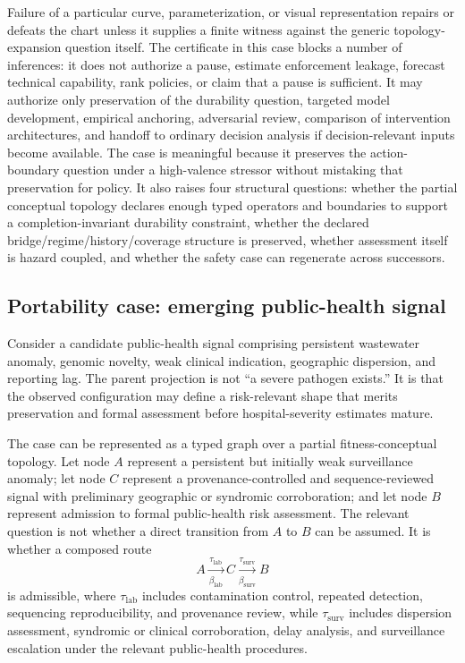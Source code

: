 \documentclass[11pt]{article}
\begin{document}
Failure of a particular curve, parameterization, or visual representation repairs or defeats the chart unless it supplies a finite witness against the generic topology-expansion question itself. The certificate in this case blocks a number of inferences: it does not authorize a pause, estimate enforcement leakage, forecast technical capability, rank policies, or claim that a pause is sufficient. It may authorize only preservation of the durability question, targeted model development, empirical anchoring, adversarial review, comparison of intervention architectures, and handoff to ordinary decision analysis if decision-relevant inputs become available. The case is meaningful because it preserves the action-boundary question under a high-valence stressor without mistaking that preservation for policy. It also raises four structural questions: whether the partial conceptual topology declares enough typed operators and boundaries to support a completion-invariant durability constraint, whether the declared bridge/regime/history/coverage structure is preserved, whether assessment itself is hazard coupled, and whether the safety case can regenerate across successors.

\subsection{Portability case: emerging public-health signal}
\label{sec:public-health}

Consider a candidate public-health signal comprising persistent wastewater anomaly, genomic novelty, weak clinical indication, geographic dispersion, and reporting lag. The parent projection is not ``a severe pathogen exists.'' It is that the observed configuration may define a risk-relevant shape that merits preservation and formal assessment before hospital-severity estimates mature.

The case can be represented as a typed graph over a partial fitness-conceptual topology. Let node $A$ represent a persistent but initially weak surveillance anomaly; let node $C$ represent a provenance-controlled and sequence-reviewed signal with preliminary geographic or syndromic corroboration; and let node $B$ represent admission to formal public-health risk assessment. The relevant question is not whether a direct transition from $A$ to $B$ can be assumed. It is whether a composed route
\begin{equation}
A \xrightarrow[\beta_{\mathrm{lab}}]{\tau_{\mathrm{lab}}} C
\xrightarrow[\beta_{\mathrm{surv}}]{\tau_{\mathrm{surv}}} B
\label{eq:public-health-composition}
\end{equation}
is admissible, where $\tau_{\mathrm{lab}}$ includes contamination control, repeated detection, sequencing reproducibility, and provenance review, while $\tau_{\mathrm{surv}}$ includes dispersion assessment, syndromic or clinical corroboration, delay analysis, and surveillance escalation under the relevant public-health procedures.
\end{document}
